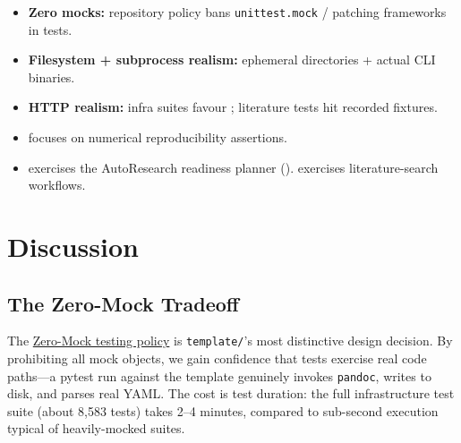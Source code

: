 \documentclass[
  english,
]{article}
\begin{document}
\begin{itemize}
\item
  \textbf{Zero mocks:} repository policy bans \texttt{unittest.mock} /
  patching frameworks in tests.
\item
  \textbf{Filesystem + subprocess realism:} ephemeral directories +
  actual CLI binaries.
\item
  \textbf{HTTP realism:} infra suites favour ;
  literature tests hit recorded fixtures.
\item
  \textbf{} focuses on numerical
  reproducibility assertions.
\item
  \textbf{} exercises the
  AutoResearch readiness planner
  ().
  \textbf{} exercises
  literature-search workflows.
\end{itemize}

\newpage

\section{Discussion}\label{discussion}

\subsection{The Zero-Mock Tradeoff}\label{the-zero-mock-tradeoff}

The \href{03e_quality.md\#zero-mock-testing-policy}{Zero-Mock testing
policy} is \texttt{template/}'s most distinctive design decision. By
prohibiting all mock objects, we gain confidence that tests exercise
real code paths---a pytest run against the template genuinely invokes
\texttt{pandoc}, writes to disk, and parses real YAML. The cost is test
duration: the full infrastructure test suite (about 8,583
tests) takes 2--4 minutes, compared to sub-second execution typical of
heavily-mocked suites.
\end{document}
